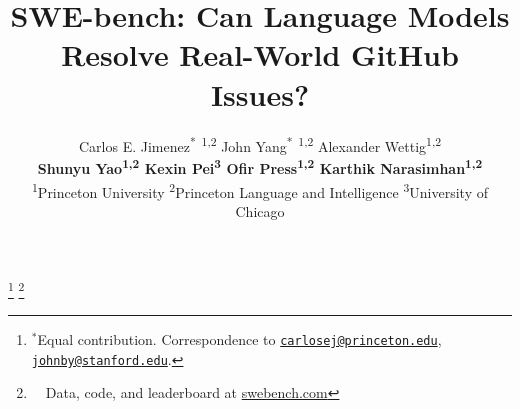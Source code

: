 \documentclass{article}
\title{SWE-bench: Can Language Models Resolve Real-World GitHub Issues?}
\author{Carlos E. Jimenez\textsuperscript{*\ 1,2} \quad John Yang\textsuperscript{*\ 1,2} \quad Alexander Wettig\textsuperscript{1,2}
\\[0.2cm]
\textbf{Shunyu Yao\textsuperscript{1,2} \quad Kexin Pei\textsuperscript{3} \quad Ofir Press\textsuperscript{1,2} \quad Karthik Narasimhan\textsuperscript{1,2}}
\\[0.2cm]
\textsuperscript{1}{Princeton University} \quad \textsuperscript{2}{Princeton Language and Intelligence} \quad \textsuperscript{3}{University of Chicago}
}
\begin{document}
\maketitle


\let\thefootnote\relax\footnote{$^*$Equal contribution. 
Correspondence to \texttt{\href{mailto:carlosej@princeton.edu}{carlosej@princeton.edu}},
\texttt{\href{mailto:johnby@stanford.edu}{johnby@stanford.edu}}.
}
\let\thefootnote\relax\footnote{~~Data, code, and leaderboard at \href{https://swebench.com}{swebench.com}}








\newpage



\newpage



\newpage
\appendix






\end{document}
